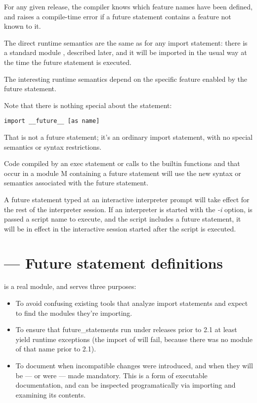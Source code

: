 For any given release, the compiler knows which feature names have been
defined, and raises a compile-time error if a future statement contains
a feature not known to it.

The direct runtime semantics are the same as for any import statement:
there is a standard module , described later, and
it will be imported in the usual way at the time the future statement
is executed.

The interesting runtime semantics depend on the specific feature
enabled by the future statement.

Note that there is nothing special about the statement:

\begin{verbatim}
import __future__ [as name]
\end{verbatim}

That is not a future statement; it's an ordinary import statement, with
no special semantics or syntax restrictions.

Code compiled by an exec statement or calls to the builtin functions
 and  that occur in a module M
containing a future statement will use the new syntax or semantics
associated with the future statement.

A future statement typed at an interactive interpreter prompt will
take effect for the rest of the interpreter session.  If an
interpreter is started with the \emph{-i} option, is passed a
script name to execute, and the script includes a future statement, it
will be in effect in the interactive session started after the script
is executed.

\section{ ---
	 Future statement definitions}


 is a real module, and serves three purposes:

\begin{itemize}

\item To avoid confusing existing tools that analyze import statements
      and expect to find the modules they're importing.

\item To ensure that future_statements run under releases prior to 2.1
      at least yield runtime exceptions (the import of
       will fail, because there was no module of
      that name prior to 2.1). 

\item To document when incompatible changes were introduced, and when they
      will be --- or were --- made mandatory.  This is a form of executable
      documentation, and can be inspected programatically via importing
       and examining its contents.

\end{itemize}

